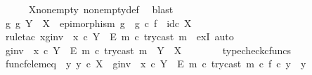 \begin{isabellebody}
\ \ \ \ \isamarkupfalse%
\ X{\isacharunderscore}{\kern0pt}nonempty\ nonempty{\isacharunderscore}{\kern0pt}def\ \isamarkupfalse%
\ blast\isanewline
\isanewline
\ \ \isamarkupfalse%
\ {\isachardoublequoteopen}{\isasymexists}g{\isachardot}{\kern0pt}\ g{\isacharcolon}{\kern0pt}\ Y\ {\isasymrightarrow}\ X\ {\isasymand}\ epimorphism\ g\ {\isasymand}\ g\ {\isasymcirc}\isactrlsub c\ f\ {\isacharequal}{\kern0pt}\ id\isactrlsub c\ X{\isachardoublequoteclose}\isanewline
\ \ \isamarkupfalse%
\ {\isacharparenleft}{\kern0pt}rule{\isacharunderscore}{\kern0pt}tac\ x{\isacharequal}{\kern0pt}{\isachardoublequoteopen}{\isacharparenleft}{\kern0pt}g{\isacharunderscore}{\kern0pt}inv\ {\isasymamalg}\ {\isacharparenleft}{\kern0pt}x\ {\isasymcirc}\isactrlsub c\ {\isasymbeta}\isactrlbsub Y\ {\isasymsetminus}\ {\isacharparenleft}{\kern0pt}E{\isacharcomma}{\kern0pt}\ m{\isacharparenright}{\kern0pt}\isactrlesub {\isacharparenright}{\kern0pt}{\isacharparenright}{\kern0pt}\ {\isasymcirc}\isactrlsub c\ try{\isacharunderscore}{\kern0pt}cast\ m{\isachardoublequoteclose}\ \ exI{\isacharcomma}{\kern0pt}\ auto{\isacharparenright}{\kern0pt}\isanewline
\ \ \ \ \isamarkupfalse%
\ {\isachardoublequoteopen}g{\isacharunderscore}{\kern0pt}inv\ {\isasymamalg}\ {\isacharparenleft}{\kern0pt}x\ {\isasymcirc}\isactrlsub c\ {\isasymbeta}\isactrlbsub Y\ {\isasymsetminus}\ {\isacharparenleft}{\kern0pt}E{\isacharcomma}{\kern0pt}\ m{\isacharparenright}{\kern0pt}\isactrlesub {\isacharparenright}{\kern0pt}\ {\isasymcirc}\isactrlsub c\ try{\isacharunderscore}{\kern0pt}cast\ m\ {\isacharcolon}{\kern0pt}\ Y\ {\isasymrightarrow}\ X{\isachardoublequoteclose}\isanewline
\ \ \ \ \ \ \isamarkupfalse%
\ typecheck{\isacharunderscore}{\kern0pt}cfuncs\isanewline
\isanewline
\ \ \ \ \isamarkupfalse%
\ func{\isacharunderscore}{\kern0pt}f{\isacharunderscore}{\kern0pt}elem{\isacharunderscore}{\kern0pt}eq{\isacharcolon}{\kern0pt}\ {\isachardoublequoteopen}{\isasymAnd}\ y{\isachardot}{\kern0pt}\ y\ {\isasymin}\isactrlsub c\ X\ {\isasymLongrightarrow}\ {\isacharparenleft}{\kern0pt}g{\isacharunderscore}{\kern0pt}inv\ {\isasymamalg}\ {\isacharparenleft}{\kern0pt}x\ {\isasymcirc}\isactrlsub c\ {\isasymbeta}\isactrlbsub Y\ {\isasymsetminus}\ {\isacharparenleft}{\kern0pt}E{\isacharcomma}{\kern0pt}\ m{\isacharparenright}{\kern0pt}\isactrlesub {\isacharparenright}{\kern0pt}\ {\isasymcirc}\isactrlsub c\ try{\isacharunderscore}{\kern0pt}cast\ m{\isacharparenright}{\kern0pt}\ {\isasymcirc}\isactrlsub c\ f\ {\isasymcirc}\isactrlsub c\ y\ {\isacharequal}{\kern0pt}\ y{\isachardoublequoteclose}\isanewline

\end{isabellebody}
